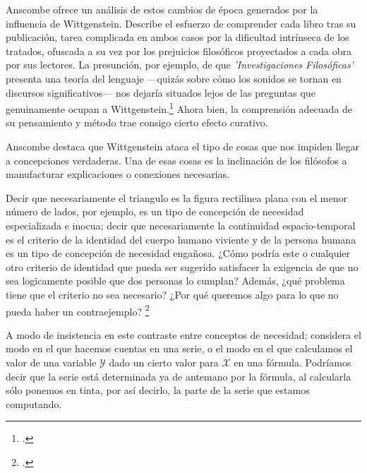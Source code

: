 Anscombe ofrece un análisis de estos cambios de época generados por la
influencia de Wittgenstein. Describe el esfuerzo de comprender cada libro tras
su publicación, tarea complicada en ambos casos por la dificultad intrínseca de
los tratados, ofuscada a su vez por los prejuicios filosóficos proyectados a
cada obra por sus lectores. La presunción, por ejemplo, de que
\emph{'Investigaciones Filosóficas'} presenta una teoría del lenguaje ---quizás
sobre cómo los sonidos se tornan en discursos significativos--- nos dejaría
situados lejos de las preguntas que genuinamente ocupan a
Wittgenstein.\footcite[cf.~][p.~183]{twocuts} Ahora bien, la comprensión
adecuada de su pensamiento y método trae consigo cierto efecto curativo.

Anscombe destaca que Wittgenstein ataca el tipo de cosas que nos impiden llegar
a concepciones verdaderas. Una de esas cosas es la inclinación de los filósofos
a manufacturar explicaciones o conexiones necesarias.

Decir que necesariamente el triangulo es la figura rectilinea plana con el menor
número de lados, por ejemplo, es un tipo de concepción de necesidad
especializada e inocua; decir que necesariamente la continuidad espacio-temporal
es el criterio de la identidad del cuerpo humano viviente y de la persona humana
es un tipo de concepción de necesidad engañosa. ¿Cómo podría este o cualquier
otro criterio de identidad que pueda ser sugerido satisfacer la exigencia de que
no sea logicamente posible que dos personas lo cumplan? Además, ¿qué problema
tiene que el criterio no sea necesario? ¿Por qué queremos algo para lo que no
pueda haber un contraejemplo? \footcite[cf.~][p.~184]{twocuts}

A modo de insistencia en este contraste entre conceptos de necesidad; considera
   el modo en el que hacemos cuentas en una serie, o el modo en el que calculamos
   el valor de una variable $\mathcal{Y}$ dado un cierto valor para $\mathcal{X}$
   en una fórmula. Podríamos decir que la serie está determinada ya de antemano por
   la fórmula, al calcularla sólo ponemos en tinta, por así decirlo, la parte de la
   serie que estamos computando.



